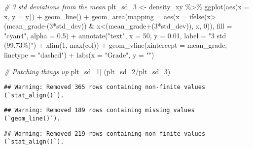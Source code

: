 \documentclass[
]{article}
\newenvironment{Shaded}{\begin{snugshade}}{\end{snugshade}}
\newcommand{\AttributeTok}[1]{\textcolor[rgb]{0.77,0.63,0.00}{#1}}
\newcommand{\CommentTok}[1]{\textcolor[rgb]{0.56,0.35,0.01}{\textit{#1}}}
\newcommand{\DecValTok}[1]{\textcolor[rgb]{0.00,0.00,0.81}{#1}}
\newcommand{\FloatTok}[1]{\textcolor[rgb]{0.00,0.00,0.81}{#1}}
\newcommand{\FunctionTok}[1]{\textcolor[rgb]{0.00,0.00,0.00}{#1}}
\newcommand{\NormalTok}[1]{#1}
\newcommand{\OtherTok}[1]{\textcolor[rgb]{0.56,0.35,0.01}{#1}}
\newcommand{\SpecialCharTok}[1]{\textcolor[rgb]{0.00,0.00,0.00}{#1}}
\newcommand{\StringTok}[1]{\textcolor[rgb]{0.31,0.60,0.02}{#1}}
\begin{document}
\begin{Shaded}
\begin{Highlighting}[]
\CommentTok{\# 3 std deviations from the mean}
\NormalTok{plt\_sd\_3 }\OtherTok{\textless{}{-}}\NormalTok{ density\_xy }\SpecialCharTok{\%\textgreater{}\%}
  \FunctionTok{ggplot}\NormalTok{(}\FunctionTok{aes}\NormalTok{(}\AttributeTok{x =}\NormalTok{ x, }\AttributeTok{y =}\NormalTok{ y)) }\SpecialCharTok{+}
  \FunctionTok{geom\_line}\NormalTok{() }\SpecialCharTok{+}
  \FunctionTok{geom\_area}\NormalTok{(}\AttributeTok{mapping =} \FunctionTok{aes}\NormalTok{(}\AttributeTok{x =} \FunctionTok{ifelse}\NormalTok{(x}\SpecialCharTok{\textgreater{}}\NormalTok{(mean\_grade}\SpecialCharTok{{-}}\NormalTok{(}\DecValTok{3}\SpecialCharTok{*}\NormalTok{std\_dev)) }\SpecialCharTok{\&}\NormalTok{ x}\SpecialCharTok{\textless{}}\NormalTok{(mean\_grade}\SpecialCharTok{+}\NormalTok{(}\DecValTok{3}\SpecialCharTok{*}\NormalTok{std\_dev)), x, }\DecValTok{0}\NormalTok{)), }\AttributeTok{fill =} \StringTok{"cyan4"}\NormalTok{, }\AttributeTok{alpha =} \FloatTok{0.5}\NormalTok{) }\SpecialCharTok{+}
  \FunctionTok{annotate}\NormalTok{(}\StringTok{"text"}\NormalTok{, }\AttributeTok{x =} \DecValTok{50}\NormalTok{, }\AttributeTok{y =} \FloatTok{0.01}\NormalTok{, }\AttributeTok{label =} \StringTok{"3 std (99.73\%)"}\NormalTok{) }\SpecialCharTok{+}
  \FunctionTok{xlim}\NormalTok{(}\DecValTok{1}\NormalTok{, }\FunctionTok{max}\NormalTok{(col)) }\SpecialCharTok{+}
  \FunctionTok{geom\_vline}\NormalTok{(}\AttributeTok{xintercept =}\NormalTok{ mean\_grade, }\AttributeTok{linetype =} \StringTok{"dashed"}\NormalTok{) }\SpecialCharTok{+}
  \FunctionTok{labs}\NormalTok{(}\AttributeTok{x =} \StringTok{"Grade"}\NormalTok{, }\AttributeTok{y =} \StringTok{""}\NormalTok{)}



\CommentTok{\# Patching things up}
\NormalTok{plt\_sd\_1}\SpecialCharTok{|}\NormalTok{ (plt\_sd\_2}\SpecialCharTok{/}\NormalTok{plt\_sd\_3) }
\end{Highlighting}
\end{Shaded}

\begin{verbatim}
## Warning: Removed 365 rows containing non-finite values (`stat_align()`).
\end{verbatim}

\begin{verbatim}
## Warning: Removed 189 rows containing missing values (`geom_line()`).
\end{verbatim}

\begin{verbatim}
## Warning: Removed 219 rows containing non-finite values (`stat_align()`).
\end{verbatim}
\end{document}
